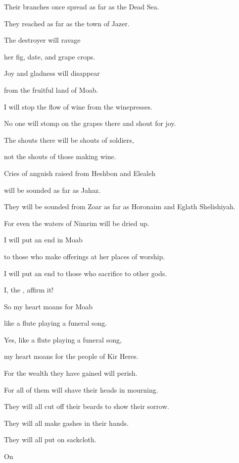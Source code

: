 {\par }{\Q Their branches
once spread
as far as
the Dead Sea.
\par }{\Q They reached
as far as the town of Jazer.
\par }{\Q The destroyer
will ravage
\par }{\Q her fig, date,
and grape crops.
\par }{\Q {}Joy
and gladness
will disappear
\par }{\Q from the fruitful
land
of Moab.
\par }{\Q I will stop
the flow of wine
from the winepresses.
\par }{\Q No
one will stomp on
the grapes there and shout for joy.

\par }{\Q The shouts
there will be shouts
of soldiers,
\par }{\Q not
the shouts of those making wine.
\par }{\Q {}Cries
of anguish
raised from Heshbon
and Elealeh
\par }{\Q will be sounded
as far as
Jahaz.
\par }{\Q They will be sounded
from Zoar
as far as
Horonaim
and Eglath Shelishiyah.
\par }{\Q For
even
the waters
of Nimrim
will be
dried up.
\par }{\Q {}I will put an end
in Moab
\par }{\Q to those who make offerings
at her places of worship.
\par }{\Q I will put an end to those who sacrifice
to other gods.
\par }{\Q I, the
{}, affirm it!
\par }{\Q {}So
my heart
moans
for Moab
\par }{\Q like a flute
playing a funeral song.
\par }{\Q Yes, like a flute
playing a funeral song,
\par }{\Q my heart
moans
for
the people
of Kir Heres.
\par }{\Q For
the wealth
they have gained
will perish.
\par }{\Q {}For
all
of them will shave their heads
in mourning.
\par }{\Q They will all
cut off
their beards
to show their sorrow.
\par }{\Q They will all
make gashes
in their hands.
\par }{\Q They will all
put on
sackcloth.
\par }{\Q {}On
}
